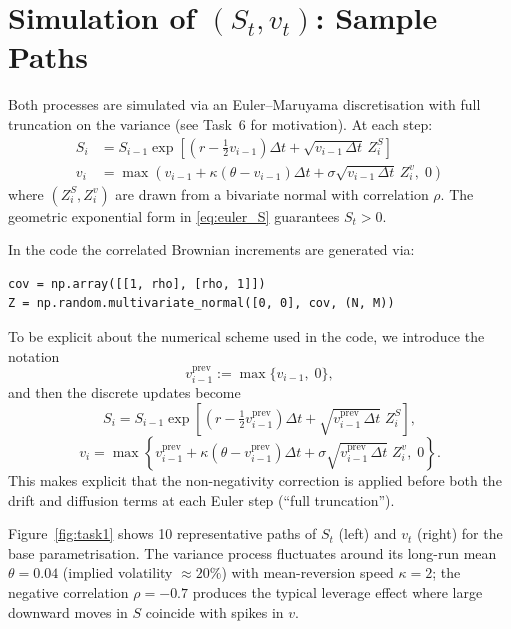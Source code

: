 \documentclass{report}
\begin{document}
\section{Simulation of $(S_t, v_t)$: Sample Paths}

Both processes are simulated via an Euler--Maruyama discretisation with
full truncation on the variance (see Task~6 for motivation).  At each step:
\begin{align}
    S_{i} &= S_{i-1}\exp\!\left[\left(r - \tfrac{1}{2}v_{i-1}\right)\Delta t
             + \sqrt{v_{i-1}\,\Delta t}\,Z^S_i\right] \label{eq:euler_S}\\
    v_{i} &= \max\!\left(v_{i-1} + \kappa(\theta - v_{i-1})\Delta t
             + \sigma\sqrt{v_{i-1}\,\Delta t}\,Z^v_i,\; 0\right) \label{eq:euler_v}
\end{align}
where $(Z^S_i, Z^v_i)$ are drawn from a bivariate normal with correlation $\rho$.
The geometric exponential form in \eqref{eq:euler_S} guarantees $S_t > 0$.

\medskip
\noindent In the code the correlated Brownian increments are generated via:
\begin{lstlisting}[style=pythonstyle]
cov = np.array([[1, rho], [rho, 1]])
Z = np.random.multivariate_normal([0, 0], cov, (N, M))
\end{lstlisting}

\medskip
\noindent To be explicit about the numerical scheme used in the code, we
introduce the notation
$$
    v_{i-1}^{\mathrm{prev}} := \max\{v_{i-1},\;0\},
$$
and then the discrete updates become
$$
    S_{i} = S_{i-1}\exp\left[\left(r - \tfrac{1}{2}v_{i-1}^{\mathrm{prev}}\right)\Delta t
             + \sqrt{v_{i-1}^{\mathrm{prev}}\,\Delta t}\;Z^S_i\right],
$$
$$
    v_{i} = \max\left\{v_{i-1}^{\mathrm{prev}} + \kappa(\theta - v_{i-1}^{\mathrm{prev}})\Delta t
             + \sigma\sqrt{v_{i-1}^{\mathrm{prev}}\,\Delta t}\;Z^v_i,\;0\right\}.
$$
This makes explicit that the non-negativity correction is applied before both
the drift and diffusion terms at each Euler step (``full truncation'').

Figure~\ref{fig:task1} shows 10 representative paths of $S_t$ (left) and
$v_t$ (right) for the base parametrisation.  The variance process fluctuates
around its long-run mean $\theta = 0.04$ (implied volatility $\approx 20\%$)
with mean-reversion speed $\kappa = 2$; the negative correlation $\rho = -0.7$
produces the typical leverage effect where large downward moves in $S$ coincide
with spikes in $v$.
\end{document}
